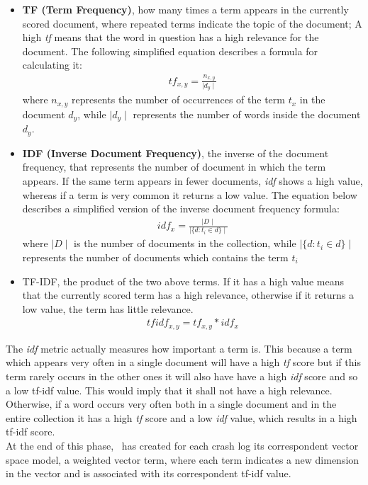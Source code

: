 \begin{itemize}
\item \textbf{TF (Term Frequency)}, \ie how many times a term appears in the currently scored document, where repeated terms indicate the topic of the document; A high \textit{tf} means that the word in question has a high relevance for the document. The following simplified equation \cite{tfidf} describes a formula for calculating it:
\begin{align*}
tf_{x,y} = \frac{n_{x,y}}{\mid d_{y} \mid}
\end{align*}
where $n_{x,y}$ represents the number of occurrences of the term $t_x$ in the document $d_{y}$, while $\mid d_{y} \mid$ represents the number of words inside the document $d_{y}$.

\item \textbf{IDF (Inverse Document Frequency)}, \ie the inverse of the document frequency, that represents the number of document in which the term appears. 
If the same term appears in fewer documents, \textit{idf} shows a high value, whereas if a term is very common it returns a low value. 
The equation \cite{tfidf} below describes a simplified version of the inverse document frequency formula: 
\begin{align*}
idf_{x} = \frac{\mid D \mid}{\mid \{d: t_{i} \in d\} \mid}
\end{align*}
where $\mid D \mid$ is the number of documents in the collection, while $\mid \{d: t_{i} \in d\} \mid$ represents the number of documents which contains the term $t_i$

\item TF-IDF, \ie the product of the two above terms. If it has a high value means that the currently scored term has a high relevance, otherwise if it returns a low value, the term has little relevance.
\begin{align*}
tfidf_{x,y} = tf_{x,y}*idf_{x}
\end{align*}

\end{itemize}
The \textit{idf} metric actually measures how important a term is. 
This because a term which appears very often in a single document will have a high \textit{tf} score but if this term rarely occurs in the other ones it will also have have a high \textit{idf} score and so a low tf-idf value. 
This would imply that it shall not have a high relevance. 
Otherwise, if a word occurs very often both in a single document and in the entire collection it has a high \textit{tf} score and a low \textit{idf} value, which results in a high tf-idf score. \\
At the end of this phase, \toolname\ has created for each crash log its correspondent vector space model, \ie a weighted vector term, where each term indicates a new dimension in the vector and is associated with its correspondent tf-idf value. 


